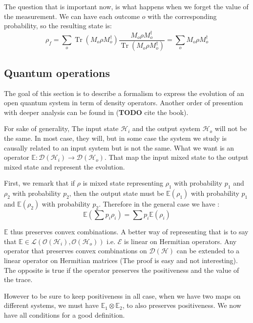 \documentclass[10pt]{report}
\theoremstyle{plain}
\theoremstyle{definition}
\theoremstyle{remark}
\newcommand{\TODO}{\textbf{TODO}}
\DeclareMathOperator{\Tr}{Tr}
\begin{document}
The question that is important now, is what happens when we forget the value of
the measurement. We can have each outcome $o$ with the corresponding
probability, so the resulting state is:
\[\rho_f = \sum_o \Tr(M_o\rho M_o^\dagger)\frac{M_o\rho M_o^\dagger}{\Tr(M_o\rho
    M_o^\dagger)}
  =\sum_o M_o\rho M_o^\dagger \]



\subsection{Quantum operations}

The goal of this section is to describe a formalism to express the evolution of
an open quantum system in term of density operators. Another order of presention
with deeper analysis can be found in (\TODO{} cite the book).

For sake of generality, The input state
$\mathcal{H}_i$ and the output system $\mathcal{H}_o$ will not be the same. In
most case, they will, but in some case the system we study is causally related to
an input system but is not the same.
What we want is an operator $\mathbb{E} : \mathcal{D}(\mathcal{H}_i) \to
\mathcal{D}(\mathcal{H}_o)$. That map the input mixed state to the output mixed
state and represent the evolution.

First, we remark that if $\rho$ is mixed state representing $\rho_1$ with
probability $p_1$ and $\rho_2$ with probability $p_2$, then the output state
must be $\mathbb E(\rho_1)$ with probability $p_1$ and $\mathbb E(\rho_2)$ with
probability $p_2$. Therefore in the general case we have :
\[\mathbb E(\sum p_i \rho_i) = \sum p_i \mathbb E(\rho_i)\]

$\mathbb E$ thus preserves convex combinations. A better way of representing
that is to say that $\mathbb E \in
\mathcal{L}(\mathcal{O}(\mathcal{H}_i),\mathcal{O}(\mathcal{H}_o))$ i.e.
$\mathcal{E}$ is linear on Hermitian operators. Any operator that preserves
convex combinations on $\mathcal{D}(\mathcal{H})$ can be extended to a linear
operator on Hermitian matrices (The proof is easy and not interesting). The
opposite is true if the operator preserves the positiveness and the value of the
trace.

However to be sure to keep positiveness in all case, when we have two maps on
different systems, we must have $\mathbb{E}_1
\otimes \mathbb{E}_2$, to also preserves positiveness. We now have all
conditions for a good definition.
\end{document}
